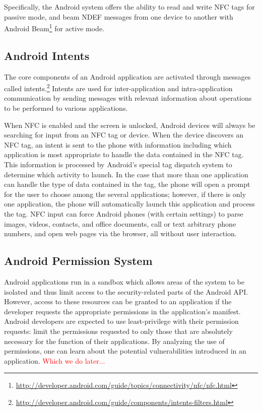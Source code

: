 \documentclass[12pt]{article}
\newcommand\TODO[1]{\textcolor{red}{#1}}
\begin{document}
Specifically, the Android system offers the ability to read and write NFC tags for passive mode, and beam NDEF messages from one device to another with Android Beam\footnote{\url{http://developer.android.com/guide/topics/connectivity/nfc/nfc.html}} for active mode. 

\subsection{Android Intents}
The core components of an Android application are activated through messages called intents.\footnote{\url{http://developer.android.com/guide/components/intents-filters.html}}
Intents are used for inter-application and intra-application communication by sending messages with relevant information about operations to be performed to various applications.  

When NFC is enabled and the screen is unlocked, Android devices will always be searching for input from an NFC tag or device. 
When the device discovers an NFC tag, an intent is sent to the phone with information including which application is most appropriate to handle the data contained in the NFC tag.
This information is processed by Android's special tag dispatch system to determine which activity to launch.
In the case that more than one application can handle the type of data contained in the tag, the phone will open a prompt for the user to choose among the several applications; however, if there is only one application, the phone will automatically launch this application and process the tag.
NFC input can force Android phones (with certain settings) to parse images, videos, contacts, and office documents, call or text arbitrary phone numbers, and open web pages via the browser, all without user interaction.  

\subsection{Android Permission System}
Android applications run in a sandbox which allows areas of the system to be isolated and thus limit access to the security-related parts of the Android API. However, access to these resources can be granted to an application if the developer requests the appropriate permissions in the application's manifest. Android developers are expected to use least-privilege with their permission requests: limit the permissions requested to only those that are absolutely necessary for the function of their applications. By analyzing the use of permissions, one can learn about the potential vulnerabilities introduced in an application. \TODO{Which we do later...}
\end{document}

